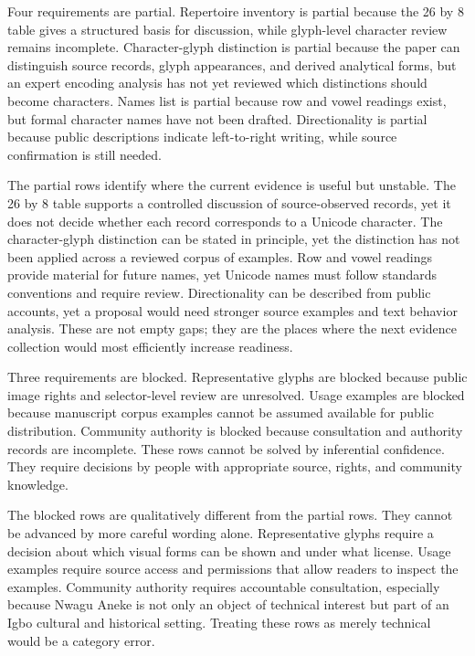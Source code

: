 \documentclass[sigconf,nonacm]{acmart}
\begin{document}
Four requirements are partial. Repertoire inventory is partial because the 26 by
8 table gives a structured basis for discussion, while glyph-level character
review remains incomplete. Character-glyph distinction is partial because the
paper can distinguish source records, glyph appearances, and derived analytical
forms, but an expert encoding analysis has not yet reviewed which distinctions
should become characters. Names list is partial because row and vowel readings
exist, but formal character names have not been drafted. Directionality is
partial because public descriptions indicate left-to-right writing, while
source confirmation is still needed.

The partial rows identify where the current evidence is useful but unstable.
The 26 by 8 table supports a controlled discussion of source-observed records,
yet it does not decide whether each record corresponds to a Unicode character.
The character-glyph distinction can be stated in principle, yet the distinction
has not been applied across a reviewed corpus of examples. Row and vowel
readings provide material for future names, yet Unicode names must follow
standards conventions and require review. Directionality can be described from
public accounts, yet a proposal would need stronger source examples and text
behavior analysis. These are not empty gaps; they are the places where the next
evidence collection would most efficiently increase readiness.

Three requirements are blocked. Representative glyphs are blocked because public
image rights and selector-level review are unresolved. Usage examples are
blocked because manuscript corpus examples cannot be assumed available for
public distribution. Community authority is blocked because consultation and
authority records are incomplete. These rows cannot be solved by inferential
confidence. They require decisions by people with appropriate source, rights,
and community knowledge.

The blocked rows are qualitatively different from the partial rows. They cannot
be advanced by more careful wording alone. Representative glyphs require a
decision about which visual forms can be shown and under what license. Usage
examples require source access and permissions that allow readers to inspect
the examples. Community authority requires accountable consultation, especially
because Nwagu Aneke is not only an object of technical interest but part of an
Igbo cultural and historical setting. Treating these rows as merely technical
would be a category error.
\end{document}
